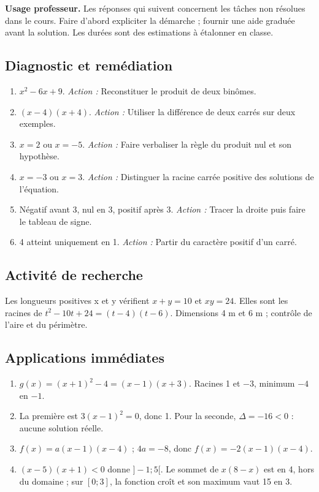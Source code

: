 \label{C02-CORR}
\textbf{Usage professeur.} Les réponses qui suivent concernent les tâches non résolues dans le cours. Faire d’abord expliciter la démarche ; fournir une aide graduée avant la solution. Les durées sont des estimations à étalonner en classe.
\subsection*{Diagnostic et remédiation}
\begin{enumerate}
\item $x^2-6x+9$. \textit{Action :} Reconstituer le produit de deux binômes.
\item $(x-4)(x+4)$. \textit{Action :} Utiliser la différence de deux carrés sur deux exemples.
\item $x=2$ ou $x=-5$. \textit{Action :} Faire verbaliser la règle du produit nul et son hypothèse.
\item $x=-3$ ou $x=3$. \textit{Action :} Distinguer la racine carrée positive des solutions de l’équation.
\item Négatif avant 3, nul en 3, positif après 3. \textit{Action :} Tracer la droite puis faire le tableau de signe.
\item 4 atteint uniquement en 1. \textit{Action :} Partir du caractère positif d’un carré.
\end{enumerate}
\subsection*{Activité de recherche}
Les longueurs positives x et y vérifient $x+y=10$ et $xy=24$. Elles sont les racines de $t^2-10t+24=(t-4)(t-6)$. Dimensions 4 m et 6 m ; contrôle de l’aire et du périmètre.
\subsection*{Applications immédiates}
\begin{enumerate}
\item $g(x)=(x+1)^2-4=(x-1)(x+3)$. Racines 1 et $-3$, minimum $-4$ en $-1$.
\item La première est $3(x-1)^2=0$, donc 1. Pour la seconde, $\Delta=-16<0$ : aucune solution réelle.
\item $f(x)=a(x-1)(x-4)$ ; $4a=-8$, donc $f(x)=-2(x-1)(x-4)$.
\item $(x-5)(x+1)<0$ donne $]-1;5[$. Le sommet de $x(8-x)$ est en 4, hors du domaine ; sur $[0;3]$, la fonction croît et son maximum vaut 15 en 3.
\end{enumerate}
